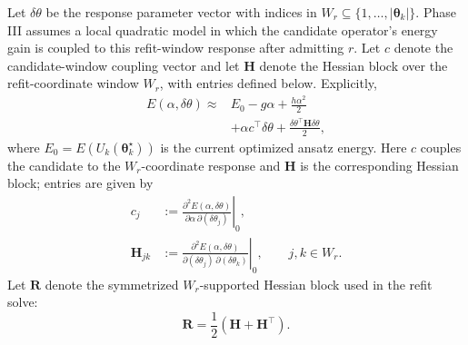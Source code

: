 \documentclass[
  reprint,
  amsmath,
  amssymb,
  aps,
  pra,
  nofootinbib,
  superscriptaddress,
  floatfix
]{revtex4-2}
\begin{document}
Let $\delta\theta$ be the response parameter vector with indices in \(W_r\subseteq\{1,\ldots,|\boldsymbol{\theta}_k|\}\). Phase III assumes a local quadratic model in which the candidate operator's energy gain is coupled to this refit-window response after admitting $r$.
Let \(c\) denote the candidate-window coupling vector and let \(\mathbf H\) denote the Hessian block over the refit-coordinate window \(W_r\), with entries defined below. Explicitly, 
\begin{equation}
\begin{split}
E(\alpha,\delta\theta)\approx{}&E_0-g\alpha+\frac{h\alpha^2}{2} \\
&+\alpha c^{\top}\delta\theta
+\frac{\delta\theta^{\top}\mathbf{H}\delta\theta}{2},
\end{split}
\label{eq:local_quadratic}
\end{equation}
where \(E_0=E(U_k(\boldsymbol\theta_k^\star))\) is the current optimized ansatz energy. Here $c$ couples the candidate to the \(W_r\)-coordinate response and $\mathbf{H}$ is the corresponding Hessian block; entries are given by
\begin{equation}
\begin{aligned}
c_j&:=
\left.
\frac{\partial^2E(\alpha,\delta\theta)}
{\partial\alpha\,\partial(\delta\theta_j)}
\right|_0,\\
\mathbf{H}_{jk}&:=
\left.
\frac{\partial^2E(\alpha,\delta\theta)}
{\partial(\delta\theta_j)\,\partial(\delta\theta_k)}
\right|_0,
\qquad j,k\in W_r .
\end{aligned}
\label{eq:phase3_window_derivatives}
\end{equation}
Let \(\mathbf R\) denote the symmetrized \(W_r\)-supported Hessian block used in the refit solve:
\begin{equation}
\mathbf R=\frac12(\mathbf H+\mathbf H^{\top}).
\label{eq:phase3_regularized_hessian}
\end{equation}
\end{document}
